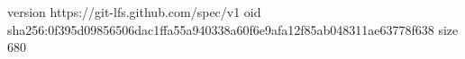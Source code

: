 version https://git-lfs.github.com/spec/v1
oid sha256:0f395d09856506dac1ffa55a940338a60f6e9afa12f85ab048311ae63778f638
size 680
